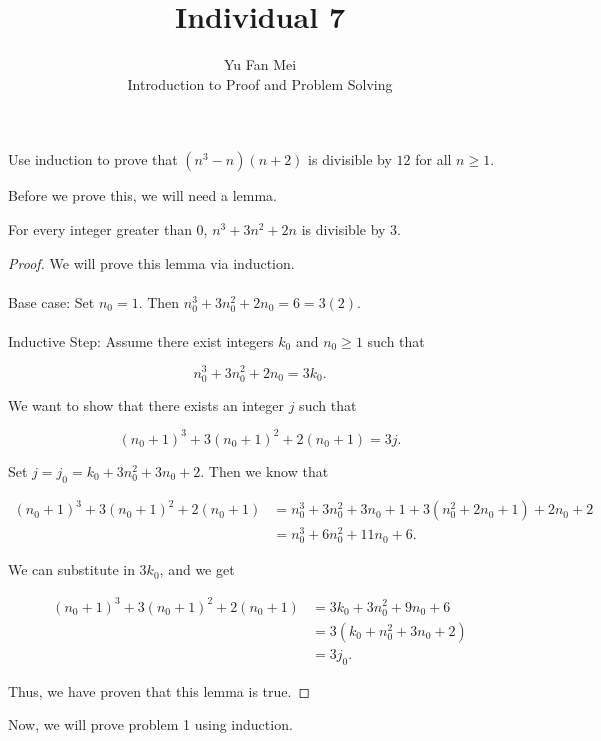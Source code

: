 \documentclass[12pt]{article}
\newenvironment{lemma}[2][Lemma]{\begin{trivlist}
\item[\hskip \labelsep {\bfseries #1}\hskip \labelsep {\bfseries #2.}]}{\end{trivlist}}
\newenvironment{problem}[2][Problem]{\begin{trivlist}
\item[\hskip \labelsep {\bfseries #1}\hskip \labelsep {\bfseries #2.}]}{\end{trivlist}}
\begin{document}

\title{Individual 7}%
\author{Yu Fan Mei\\ %
	Introduction to Proof and Problem Solving} %

\maketitle

\begin{problem}{1}
    Use induction to prove that $(n^3 - n)(n + 2)$ is divisible by $12$ for all $n \geq 1$.
\end{problem}

Before we prove this, we will need a lemma.

\begin{lemma}{1} For every integer greater than 0, $n^3 + 3n^2 + 2n$ is divisible by 3.
\end{lemma}

\begin{proof}
    We will prove this lemma via induction. \\ \\ 
    Base case: Set $n_0 = 1$. Then 
 $n_0^3 + 3n_0^2 + 2n_0 = 6 = 3(2).$ \\ \\
 \noindent
    Inductive Step: Assume there exist integers $k_0$ and $n_0 \geq 1$ such that

    $$n_0^3 + 3n_0^2 + 2n_0 = 3k_0.$$

    We want to show that there exists an integer $j$ such that

    $$(n_0+1)^3 + 3(n_0+1)^2 + 2(n_0+1) = 3j.$$

    Set $j = j_0 = k_0 + 3n_0^2 + 3n_0 + 2$. Then we know that

    \begin{align*}
        (n_0+1)^3 + 3(n_0+1)^2 + 2(n_0+1) &= n_0^3 + 3n_0^2 + 3n_0 + 1 + 3(n_0^2 + 2n_0 + 1) + 2n_0 + 2\\
        &= n_0^3 + 6n_0^2 + 11n_0 + 6.
    \end{align*}

    We can substitute in $3k_0$, and we get

    \begin{align*}
        (n_0+1)^3 + 3(n_0+1)^2 + 2(n_0+1) &= 3k_0 + 3n_0^2 + 9n_0 + 6 \\
        &= 3(k_0 + n_0^2 + 3n_0 + 2) \\
        &= 3j_0.
    \end{align*}

    Thus, we have proven that this lemma is true.
\end{proof}
\noindent Now, we will prove problem 1 using induction.
\end{document}

